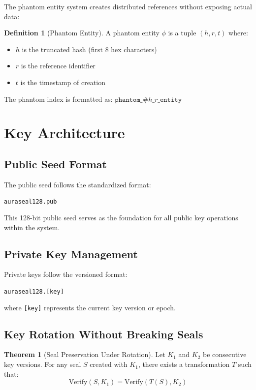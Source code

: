 \documentclass[12pt,a4paper]{report}
\theoremstyle{definition}
\newtheorem{definition}{Definition}[chapter]
\newtheorem{theorem}{Theorem}[chapter]
\newcommand{\phantomindex}[1]{\texttt{phantom\_\#}#1\texttt{\_entity}}
\begin{document}
The phantom entity system creates distributed references without exposing actual data:

\begin{definition}[Phantom Entity]
A phantom entity $\phi$ is a tuple $(h, r, t)$ where:
\begin{itemize}
    \item $h$ is the truncated hash (first 8 hex characters)
    \item $r$ is the reference identifier
    \item $t$ is the timestamp of creation
\end{itemize}
The phantom index is formatted as: $\phantomindex{h\_r}$
\end{definition}

\section{Key Architecture}

\subsection{Public Seed Format}

The public seed follows the standardized format:

\begin{center}
\texttt{auraseal128.pub}
\end{center}

This 128-bit public seed serves as the foundation for all public key operations within the system.

\subsection{Private Key Management}

Private keys follow the versioned format:

\begin{center}
\texttt{auraseal128.[key]}
\end{center}

where \texttt{[key]} represents the current key version or epoch.

\subsection{Key Rotation Without Breaking Seals}

\begin{theorem}[Seal Preservation Under Rotation]
Let $K_1$ and $K_2$ be consecutive key versions. For any seal $S$ created with $K_1$, there exists a transformation $T$ such that:
$$\text{Verify}(S, K_1) = \text{Verify}(T(S), K_2)$$
\end{theorem}
\end{document}
